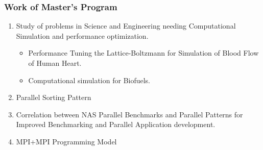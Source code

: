 


\begin{frame}
\frametitle{Work of Master's Program}
\begin{enumerate}
    \small \item \small Study of problems in Science and Engineering needing Computational Simulation and performance optimization. 
    \begin{itemize} 
    \item \small Performance Tuning the Lattice-Boltzmann for Simulation of Blood Flow of Human Heart.
    \item \small Computational simulation for Biofuels. 
    \end{itemize} 
    
    \item \small Parallel Sorting Pattern 
    \item \small Correlation between NAS Parallel Benchmarks and Parallel Patterns for Improved Benchmarking and Parallel Application development. 
    \item \small MPI+MPI Programming Model 
\end{enumerate}
\end{frame}


